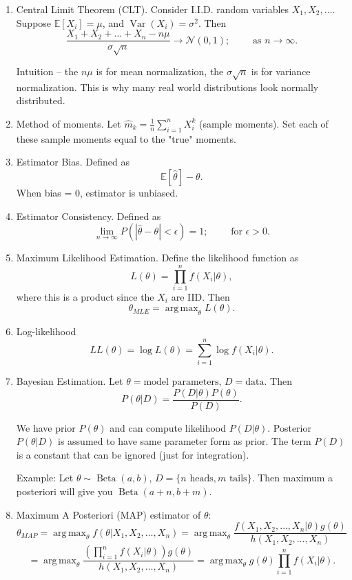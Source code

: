 \documentclass{article}
\newcommand{\EE}{\mathbb{E}}
\DeclareMathOperator{\Var}{Var}
\DeclareMathOperator{\Beta}{Beta}
\DeclareMathOperator*{\argmax}{arg\,max}
\begin{document}
\begin{enumerate}
  \item Central Limit Theorem (CLT).  Consider I.I.D. random variables $X_1, X_2, \dots$.  Suppose $\EE[X_i] = \mu$, and $\Var(X_i) = \sigma^2$.  Then
    \[
      \frac{X_1 + X_2 + \dots + X_n - n \mu}{ \sigma \sqrt{n} } \to \mathcal{N}(0, 1); \qquad \text{ as } n \to \infty.
    \]

    Intuition -- the $n \mu$ is for mean normalization, the $\sigma \sqrt{n}$ is for variance normalization. This is why many real world distributions look normally distributed.

  \item Method of moments.
    Let $\hat{m}_k = \frac{1}{n} \sum_{i=1}^{n} X_i^k$ (sample moments).  Set each of these sample moments equal to the "true" moments.

  \item Estimator Bias.  Defined as
    \[
      \EE[\hat{\theta}] - \theta.
    \]
    When bias = 0, estimator is unbiased.

  \item Estimator Consistency.  Defined as
    \[
      \lim_{n \to \infty} P(|\hat{\theta} - \theta| < \epsilon) = 1; \qquad \text{ for } \epsilon > 0.
    \]

  \item Maximum Likelihood Estimation.  Define the likelihood function as
    \[
      L(\theta) = \prod_{i=1}^{n} f(X_i | \theta),
    \]
    where this is a product since the $X_i$ are IID.  Then
    \[
      \theta_{MLE} = \argmax_{\theta} L(\theta).
    \]

  \item Log-likelihood
    \[
      LL(\theta) = \log L(\theta) = \sum_{i=1}^{n} \log f(X_i | \theta).
    \]

  \item Bayesian Estimation.  Let $\theta = \text{model parameters}$, $D = \text{data}$.  Then
    \[
      P(\theta | D) = \frac{P(D|\theta) P(\theta)}{P(D)}.
    \]

    We have prior $P(\theta)$ and can compute likelihood $P(D|\theta)$.  Posterior $P(\theta | D)$ is assumed to have same parameter form as prior.  The term $P(D)$ is a constant that can be ignored (just for integration).

    Example: Let $\theta \sim \Beta(a, b)$, $D = \{n \text{ heads}, m \text{ tails}\}$.  Then maximum a posteriori will give you $\Beta(a+n, b+m)$.

  \item Maximum A Posteriori (MAP) estimator of $\theta$:
    \[
      \theta_{MAP} = \argmax_{\theta} f(\theta | X_1, X_2, \dots, X_n) = \argmax_{\theta} \frac{f(X_1, X_2, \dots, X_n | \theta) g(\theta)}{h(X_1, X_2, \dots, X_n)}
    \]
    \[
      = \argmax_{\theta} \frac{\left(  \prod_{i=1}^{n} f(X_i | \theta) \right) g(\theta)}{h(X_1, X_2, \dots, X_n)} = \argmax_{\theta} g(\theta) \prod_{i=1}^{n} f(X_i | \theta).
    \]


\end{enumerate}
\end{document}
